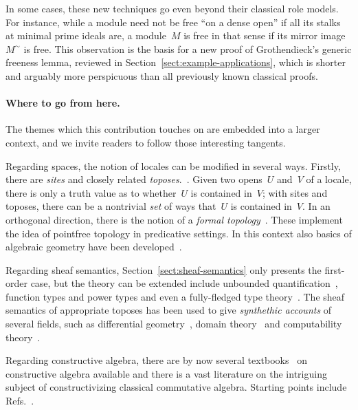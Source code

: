 \documentclass{ws-rv9x6}
\begin{document}
{In some cases, these new techniques go even beyond their classical role models.
For instance, while a module need not be free ``on a dense open'' if all its
stalks at minimal prime ideals are, a module~$M$ is free in that sense if its
mirror image~$M^\sim$ is \notnot free. This observation is the basis for a
new proof of Grothendieck's generic freeness lemma, reviewed in
Section~\ref{sect:example-applications}, which is shorter and arguably more
perspicuous than all previously known classical proofs.


\paragraph{Where to go from here.} The themes which this contribution touches
on are embedded into a larger context, and we invite readers to follow those
interesting tangents.

Regarding spaces, the notion of locales can be modified in several ways.
Firstly, there are \emph{sites} and closely related
\emph{toposes}.~\cite{leinster:introduction,moerdijk-maclane:sheaves-logic}.
Given two opens~$U$ and~$V$ of a locale, there is only a truth value as to
whether~$U$ is contained in~$V$; with sites and toposes, there can be a
nontrivial \emph{set} of ways that~$U$ is contained in~$V$. In an orthogonal
direction, there is the notion of a \emph{formal
topology}~\cite{sambin:some-points,sambin:ifs}. These implement the idea of
pointfree topology in predicative settings. In this context also basics of
algebraic geometry have been
developed~\cite{schuster:formal-zariski,cls:spectral-schemes,cls:projective-spectrum}.

Regarding sheaf semantics, Section~\ref{sect:sheaf-semantics} only presents
the first-order case, but the theory can be extended include unbounded
quantification~\cite{shulman:stack-semantics}, function types and power types
and even a fully-fledged type theory~\cite{maietti:modular-correspondence}. The
sheaf semantics of appropriate toposes has been used to give \emph{synthethic
accounts} of several fields, such as differential geometry~\cite{kock:sdg},
domain theory~\cite{hyland:synthetic-domain-theory} and computability
theory~\cite{bauer:synthetic-computability-theory}.

Regarding constructive algebra, there are by now several
textbooks~\cite{mines-richman-ruitenburg:constructive-algebra,lombardi-quitte:constructive-algebra,yengui:constructive-commutative-algebra}
on constructive algebra available and there is a vast literature on
the intriguing subject of constructivizing classical commutative algebra.
Starting points include
Refs.~.


}
\end{document}
